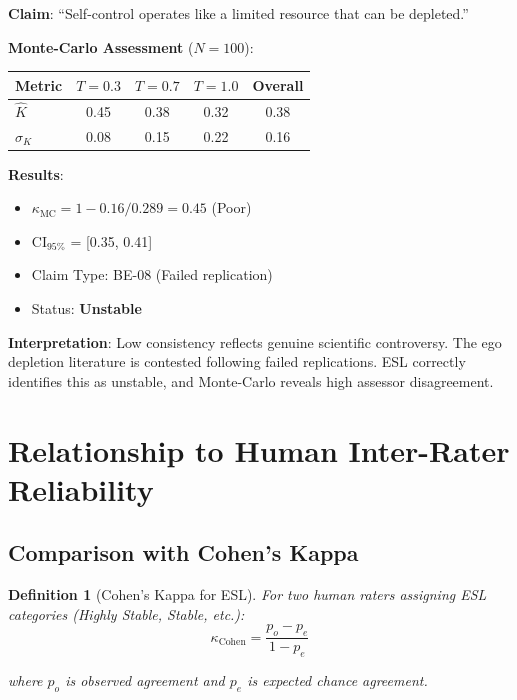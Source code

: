 \documentclass[11pt,a4paper]{article}
\newtheorem{definition}{Definition}[section]
\theoremstyle{remark}
\begin{document}
\begin{examplebox}[title={Ego Depletion Effect}]
\textbf{Claim}: ``Self-control operates like a limited resource that can be depleted.''

\textbf{Monte-Carlo Assessment} ($N = 100$):
\begin{center}
\begin{tabular}{lcccc}
\toprule
\textbf{Metric} & \textbf{$T=0.3$} & \textbf{$T=0.7$} & \textbf{$T=1.0$} & \textbf{Overall} \\
\midrule
$\hat{K}$ & 0.45 & 0.38 & 0.32 & 0.38 \\
$\sigma_K$ & 0.08 & 0.15 & 0.22 & 0.16 \\
\bottomrule
\end{tabular}
\end{center}

\textbf{Results}:
\begin{itemize}
    \item $\kappa_{\text{MC}} = 1 - 0.16/0.289 = 0.45$ (Poor)
    \item CI$_{95\%}$ = [0.35, 0.41]
    \item Claim Type: BE-08 (Failed replication)
    \item Status: \textcolor{eslred}{\textbf{Unstable}}
\end{itemize}

\textbf{Interpretation}: Low consistency reflects genuine scientific controversy. The ego depletion literature is contested following failed replications. ESL correctly identifies this as unstable, and Monte-Carlo reveals high assessor disagreement.
\end{examplebox}


\section{Relationship to Human Inter-Rater Reliability}
\label{sec:human-comparison}

\subsection{Comparison with Cohen's Kappa}

\begin{definition}[Cohen's Kappa for ESL]
\label{def:cohen}
For two human raters assigning ESL categories (Highly Stable, Stable, etc.):
\begin{equation}
\kappa_{\text{Cohen}} = \frac{p_o - p_e}{1 - p_e}
\end{equation}

where $p_o$ is observed agreement and $p_e$ is expected chance agreement.
\end{definition}
\end{document}
